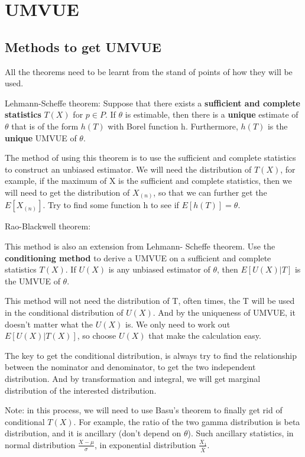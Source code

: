 \section{UMVUE}

\subsection{Methods to get UMVUE}

All the theorems need to be learnt from the stand of points of how they will be used. 

\begin{Theorem}
Lehmann-Scheffe theorem: 
Suppose that there exists a \textbf{sufficient and complete statistics} $T(X)$ for $p \in P$. If $\theta$ is estimable, then there is a \textbf{unique} estimate of $\theta$ that is of the form $h(T)$ with Borel function h. Furthermore, $h(T)$ is the \textbf{unique} UMVUE of $\theta$. 
\end{Theorem}

The method of using this theorem is to use the sufficient and complete statistics to construct an unbiased estimator. We will need the distribution of $T(X)$, for example, if the maximum of X is the sufficient and complete statistics, then we will need to get the distribution of $X_{(n)}$, so that we can further get the $E[X_{(n)}]$. Try to find some function h to see if $E[h(T)] = \theta$.


Rao-Blackwell theorem:

This method is also an extension from Lehmann- Scheffe theorem. Use the \textbf{conditioning method} to derive a UMVUE on a sufficient and complete statistics $T(X)$. If $U(X)$ is any unbiased estimator of $\theta$, then $E[U(X)| T]$ is the UMVUE of $\theta$. 

This method will not need the distribution of T, often times, the T will be used in the conditional distribution of $U(X)$. And by the uniqueness of UMVUE, it doesn't matter what the $U(X)$ is. 
We only need to work out $E[U(X)| T(X)]$, so choose $U(X)$ that make the calculation easy. 

The key to get the conditional distribution, is always try to find the relationship between the nominator and denominator, to get the two independent distribution.
 And by transformation and integral, we will get marginal distribution of the interested distribution.

Note: in this process, we will need to use Basu's theorem to finally get rid of conditional $T(X)$. For example, the ratio of the two gamma distribution is beta distribution, and it is ancillary (don't depend on $\theta$).
Such ancillary statistics, in normal distribution $\frac{X- \mu}{\sigma}$, in exponential distribution $\frac{X_1}{\bar{X}}$. 

